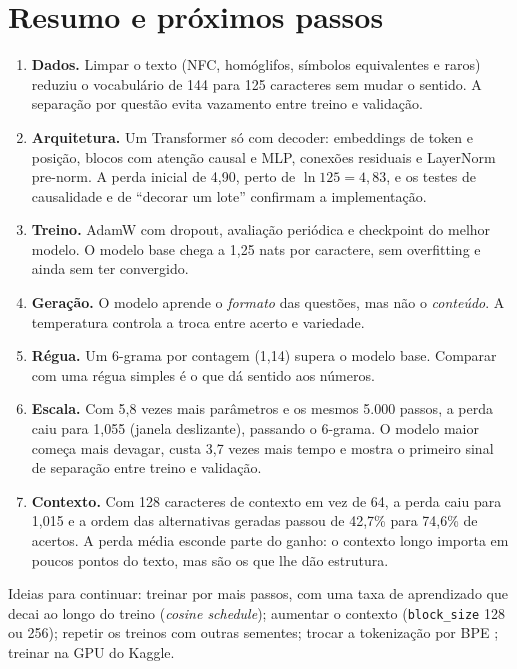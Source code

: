 \documentclass[11pt,a4paper]{article}
\begin{document}


\section{Resumo e próximos passos}

\begin{enumerate}
\item \textbf{Dados.} Limpar o texto (NFC, homóglifos, símbolos equivalentes e raros) reduziu o vocabulário de 144 para 125 caracteres sem mudar o sentido. A separação por questão evita vazamento entre treino e validação.
\item \textbf{Arquitetura.} Um Transformer só com decoder: embeddings de token e posição, blocos com atenção causal e MLP, conexões residuais e LayerNorm pre-norm. A perda inicial de 4,90, perto de $\ln 125 = 4{,}83$, e os testes de causalidade e de ``decorar um lote'' confirmam a implementação.
\item \textbf{Treino.} AdamW com dropout, avaliação periódica e checkpoint do melhor modelo. O modelo base chega a 1,25 nats por caractere, sem overfitting e ainda sem ter convergido.
\item \textbf{Geração.} O modelo aprende o \emph{formato} das questões, mas não o \emph{conteúdo}. A temperatura controla a troca entre acerto e variedade.
\item \textbf{Régua.} Um 6-grama por contagem (1,14) supera o modelo base. Comparar com uma régua simples é o que dá sentido aos números.
\item \textbf{Escala.} Com 5,8 vezes mais parâmetros e os mesmos 5.000 passos, a perda caiu para 1,055 (janela deslizante), passando o 6-grama. O modelo maior começa mais devagar, custa 3,7 vezes mais tempo e mostra o primeiro sinal de separação entre treino e validação.
\item \textbf{Contexto.} Com 128 caracteres de contexto em vez de 64, a perda caiu para 1,015 e a ordem das alternativas geradas passou de 42,7\% para 74,6\% de acertos. A perda média esconde parte do ganho: o contexto longo importa em poucos pontos do texto, mas são os que lhe dão estrutura.
\end{enumerate}

Ideias para continuar: treinar por mais passos, com uma taxa de aprendizado que decai ao longo do treino (\emph{cosine schedule}); aumentar o contexto (\texttt{block\_size} 128 ou 256); repetir os treinos com outras sementes; trocar a tokenização por BPE \cite{sennrich}; treinar na GPU do Kaggle.
\end{document}
